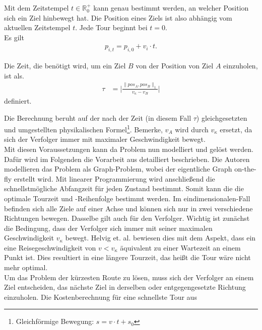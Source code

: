 \documentclass[german,version-2019-11]{uzl-thesis}
\begin{document}
\begin{definition}
\label{def:UpdatedPos}
Mit dem Zeitstempel $t\in \mathbb{R}^+_0$ kann genau bestimmt werden, an welcher Position sich ein Ziel hinbewegt hat. Die Position eines Ziels ist also abhängig vom aktuellen Zeitstempel $t$. Jede Tour beginnt bei $t=0$. \\
Es gilt
\begin{align*}
p_{i,t} = p_{i,0} + v_i\cdot t.
\end{align*} 
\end{definition}

\begin{definition}
\label{def:WegZeit}
Die Zeit, die benötigt wird, um ein Ziel $B$ von der Position von Ziel $A$ einzuholen, ist als. 
\begin{align*}
\tau &= \bigg\vert\frac{\|pos_A,pos_B\|_1}{v_{\kappa}-v_B}\bigg\vert
\end{align*} 
definiert.
\end{definition}\noindent
Die Berechnung beruht auf der nach der Zeit (in diesem Fall $\tau$) gleichgesetzten und umgestellten physikalischen Formel\footnote{Gleichförmige Bewegung: $s=v\cdot t+s_0$}.
Bemerke, $v_A$ wird durch $v_{\kappa}$ ersetzt, da sich der Verfolger immer mit maximaler Geschwindigkeit bewegt.\\
Mit diesen Voraussetzungen kann da Problem nun modelliert und gelöst werden. Dafür wird im Folgenden die Vorarbeit aus \cite{helvig} detailliert beschrieben. Die Autoren modellieren das Problem als Graph-Problem, wobei der eigentliche Graph on-the-fly erstellt wird. Mit linearer Programmierung wird anschließend die schnellstmögliche Abfangzeit für jeden Zustand bestimmt. Somit kann die die optimale Tourzeit und -Reihenfolge bestimmt werden.
Im eindimensionalen-Fall befinden sich alle Ziele auf einer Achse und können sich nur in zwei verschiedene Richtungen bewegen. Dasselbe gilt auch für den Verfolger. Wichtig ist zunächst die Bedingung, dass der Verfolger sich immer mit seiner maximalen Geschwindigkeit $v_{\kappa}$ bewegt. Helvig et. al. bewiesen dies mit dem Aspekt, dass ein eine Reisegeschwindigkeit von $v<v_{\kappa}$ äquivalent zu einer Wartezeit an einem Punkt ist. Dies resultiert in eine längere Tourzeit, das heißt die Tour wäre nicht mehr optimal.\\
Um das Problem der kürzesten Route zu lösen, muss sich der Verfolger an einem Ziel entscheiden, das nächste Ziel in derselben oder entgegengesetzte Richtung einzuholen. Die Kostenberechnung für eine schnellste Tour aus
\end{document}
